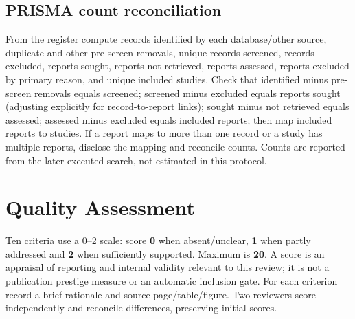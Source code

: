 \documentclass[12pt,a4paper]{article}
\begin{document}
\subsection{PRISMA count reconciliation}
From the register compute records identified by each database/other source, duplicate and other pre-screen removals, unique records screened, records excluded, reports sought, reports not retrieved, reports assessed, reports excluded by primary reason, and unique included studies. Check that identified minus pre-screen removals equals screened; screened minus excluded equals reports sought (adjusting explicitly for record-to-report links); sought minus not retrieved equals assessed; assessed minus excluded equals included reports; then map included reports to studies. If a report maps to more than one record or a study has multiple reports, disclose the mapping and reconcile counts. Counts are reported from the later executed search, not estimated in this protocol.

\section{Quality Assessment}
Ten criteria use a 0--2 scale: score \textbf{0} when absent/unclear, \textbf{1} when partly addressed and \textbf{2} when sufficiently supported. Maximum is \textbf{20}. A score is an appraisal of reporting and internal validity relevant to this review; it is not a publication prestige measure or an automatic inclusion gate. For each criterion record a brief rationale and source page/table/figure. Two reviewers score independently and reconcile differences, preserving initial scores.
\end{document}
